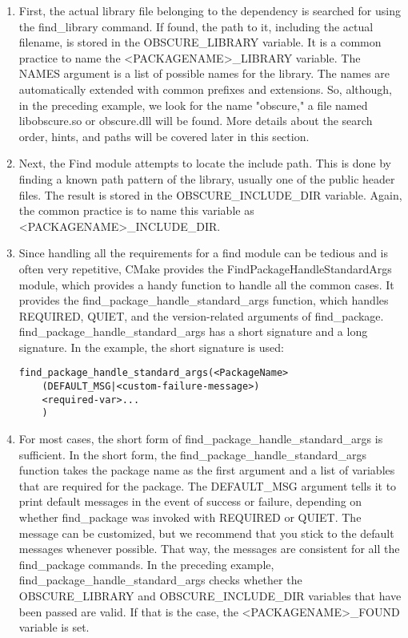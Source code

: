 \begin{enumerate}
\item 
First, the actual library file belonging to the dependency is searched for using the find\_library command. If found, the path to it, including the actual filename, is stored in the OBSCURE\_LIBRARY variable. It is a common practice to name the <PACKAGENAME>\_LIBRARY variable. The NAMES argument is a list of possible names for the library. The names are automatically extended with common prefixes and extensions. So, although, in the preceding example, we look for the name "obscure," a file named libobscure.so or obscure.dll will be found. More details about the search order, hints, and paths will be covered later in this section.

\item 
Next, the Find module attempts to locate the include path. This is done by finding a known path pattern of the library, usually one of the public header files. The result is stored in the OBSCURE\_INCLUDE\_DIR variable. Again, the common practice is to name this variable as <PACKAGENAME>\_INCLUDE\_DIR.

\item 
Since handling all the requirements for a find module can be tedious and is often very repetitive, CMake provides the FindPackageHandleStandardArgs module, which provides a handy function to handle all the common cases. It provides the find\_package\_handle\_standard\_args function, which handles REQUIRED, QUIET, and the version-related arguments of find\_package. find\_package\_handle\_standard\_args has a short signature and a long signature. In the example, the short signature is used:

\begin{lstlisting}[style=styleCMake]
find_package_handle_standard_args(<PackageName>
	(DEFAULT_MSG|<custom-failure-message>)
	<required-var>...
	)
\end{lstlisting}

\item 
For most cases, the short form of find\_package\_handle\_standard\_args is sufficient. In the short form, the find\_package\_handle\_standard\_args function takes the package name as the first argument and a list of variables that are required for the package. The DEFAULT\_MSG argument tells it to print default messages in the event of success or failure, depending on whether find\_package was invoked with REQUIRED or QUIET. The message can be customized, but we recommend that you stick to the default messages whenever possible. That way, the messages are consistent for all the find\_package commands. In the preceding example, find\_package\_handle\_standard\_args checks whether the OBSCURE\_LIBRARY and OBSCURE\_INCLUDE\_DIR variables that have been passed are valid. If that is the case, the <PACKAGENAME>\_FOUND variable is set.


\end{enumerate}
